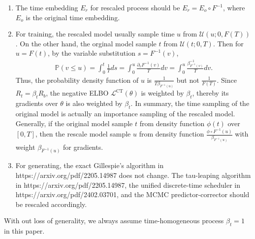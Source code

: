 \documentclass[10pt]{article}
\begin{document}
\begin{enumerate}
  \item The time embedding $E_r$ for rescaled process should be $E_r=E_o\circ F^{-1}$, where $E_o$ is the original time embedding.
  \item For training, the rescaled model usually sample time $u$ from $\mathcal{U}(u;0,F(T))$. On the other hand, the orginal model sample $t$ from $\mathcal{U}(t;0,T)$. Then for $u=F(t)$, by the variable substitution $s=F^{-1}(v)$,
  \begin{eqnarray*}
    \mathbb{P}(v\le u)=\int_0^t\frac{1}{T} ds=\int_0^u\frac{\partial_v F^{-1}(v)}{T}dv=\int_0^u\frac{\beta^{-1}_{F^{-1}(v)}}{T}dv.
  \end{eqnarray*}  
  Thus, the probability density function of $u$ is $\frac{1}{T\beta_{F^{-1}(u)}}$ but not $\frac{1}{F(T)}$. Since $R_t = \beta_t R_b$, the negative ELBO $\mathcal{L}^\text{CT}(\theta)$ is weighted by $\beta_t$, thereby its gradients over $\theta$ is also weighted by $\beta_t$. In summary, the time sampling of the original model is actually an importance sampling of the rescaled model. Generally, if the original model sample $t$ from density function $\phi(t)$ over $[0,T]$, then the rescale model sample $u$ from density function $\frac{\phi\circ F^{-1}(u)}{\beta_{F^{-1}(u)}}$ with weight $\beta_{F^{-1}(u)}$ for gradients.
  \item For generating, the exact Gillespie's algorithm in https://arxiv.org/pdf/2205.14987 does not change. The tau-leaping algorithm in https://arxiv.org/pdf/2205.14987, the unified discrete-time scheduler in https://arxiv.org/pdf/2402.03701, and the MCMC predictor-corrector should be rescaled accordingly.
\end{enumerate}
With out loss of generality, we always assume time-homogeneous process $\beta_t=1$ in this paper.




\end{document}
